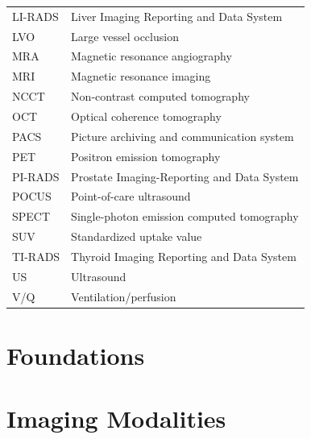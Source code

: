 \documentclass[12pt,oneside]{book}
\begin{document}
\begin{footnotesize}
\begin{longtable}{@{}ll@{}}
LI-RADS & Liver Imaging Reporting and Data System \\
LVO & Large vessel occlusion \\
MRA & Magnetic resonance angiography \\
MRI & Magnetic resonance imaging \\
NCCT & Non-contrast computed tomography \\
OCT & Optical coherence tomography \\
PACS & Picture archiving and communication system \\
PET & Positron emission tomography \\
PI-RADS & Prostate Imaging-Reporting and Data System \\
POCUS & Point-of-care ultrasound \\
SPECT & Single-photon emission computed tomography \\
SUV & Standardized uptake value \\
TI-RADS & Thyroid Imaging Reporting and Data System \\
US & Ultrasound \\
V/Q & Ventilation/perfusion \\
\bottomrule
\end{longtable}
\end{footnotesize}

\mainmatter

\part{Foundations}











\part{Imaging Modalities}



















\end{document}
